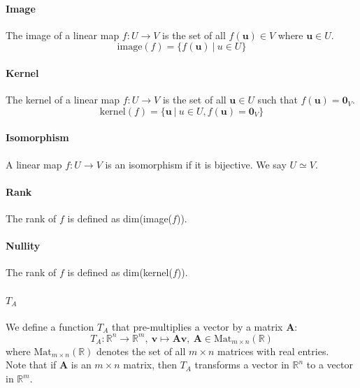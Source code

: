 \documentclass{scrartcl}
\newcommand{\R}{\mathbb{R}}
\renewcommand{\vec}[1]{\mathbf{#1}}
\begin{document}
\paragraph{Image}
The image of a linear map $ f : U \to V $ is the set of all $ f(\vec{u}) \in V $ where $ \vec{u} \in U $.
\begin{equation}
\textrm{image}(f) = \{f(\vec{u}) \ | \ u \in U \}
\end{equation}
\paragraph{Kernel}
The kernel of a linear map $ f : U \to V $ is the set of all $ \vec{u} \in U $ such that $ f(\vec{u}) = \vec{0}_{V} $.
\begin{equation}
\textrm{kernel}(f) = \{\vec{u} \ | \ u \in U, f(\vec{u}) = \vec{0}_{V} \}
\end{equation}
\paragraph{Isomorphism}
A linear map $ f : U \to V $ is an isomorphism if it is bijective. We say $ U \simeq V $.
\paragraph{Rank}
The rank of $ f $ is defined as dim(image($ f $)).
\paragraph{Nullity}
The rank of $ f $ is defined as dim(kernel($ f $)).
\paragraph{$ T_{A} $}
We define a function $ T_{A} $ that pre-multiplies a vector by a matrix $ \vec{A} $:
\begin{equation}
T_{A} : \R^{n} \to \R^{m}, \ \vec{v} \mapsto \vec{A}\vec{v}, \ \vec{A} \in \textrm{Mat}_{m \times n}(\R)
\end{equation}
where $  \textrm{Mat}_{m \times n}(\R)  $ denotes the set of all $ m \times n $ matrices with real entries.
\\
Note that if $ \vec{A} $ is an $ m \times n $ matrix, then $ T_{A} $ transforms a vector in $ \R^{n} $ to a vector in $ \R^{m} $.
\end{document}
